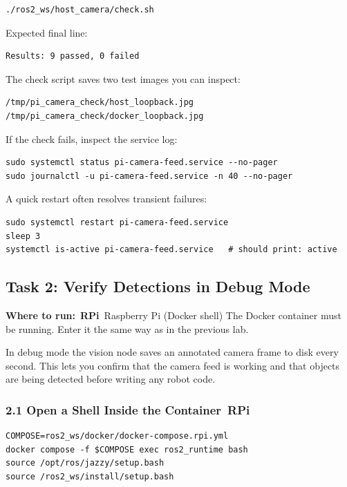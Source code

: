 \documentclass{ol-softwaremanual}
\newcommand{\onrpi}{%
  \,\colorbox{blue!20}{\footnotesize\sffamily\bfseries RPi}}
\newcommand{\machinebox}[2]{%
  \par\noindent
  \colorbox{gray!12}{\parbox{\dimexpr\linewidth-2\fboxsep}{%
    \small\sffamily\textbf{Where to run:} #1 \quad\textbar\quad #2}}%
  \par\smallskip}
\begin{document}
\begin{verbatim}
./ros2_ws/host_camera/check.sh
\end{verbatim}

Expected final line:

\begin{verbatim}
Results: 9 passed, 0 failed
\end{verbatim}

The check script saves two test images you can inspect:

\begin{verbatim}
/tmp/pi_camera_check/host_loopback.jpg
/tmp/pi_camera_check/docker_loopback.jpg
\end{verbatim}

\noindent If the check fails, inspect the service log:

\begin{verbatim}
sudo systemctl status pi-camera-feed.service --no-pager
sudo journalctl -u pi-camera-feed.service -n 40 --no-pager
\end{verbatim}

A quick restart often resolves transient failures:

\begin{verbatim}
sudo systemctl restart pi-camera-feed.service
sleep 3
systemctl is-active pi-camera-feed.service   # should print: active
\end{verbatim}


\subsection{Task 2: Verify Detections in Debug Mode}

\machinebox{\onrpi\ Raspberry Pi (Docker shell)}{The Docker container must be running. Enter it the same way as in the previous lab.}

In debug mode the vision node saves an annotated camera frame to disk every
second.
This lets you confirm that the camera feed is working and that objects are being
detected before writing any robot code.

\subsubsection*{2.1 Open a Shell Inside the Container\onrpi}

\begin{verbatim}
COMPOSE=ros2_ws/docker/docker-compose.rpi.yml
docker compose -f $COMPOSE exec ros2_runtime bash
source /opt/ros/jazzy/setup.bash
source /ros2_ws/install/setup.bash
\end{verbatim}
\end{document}
